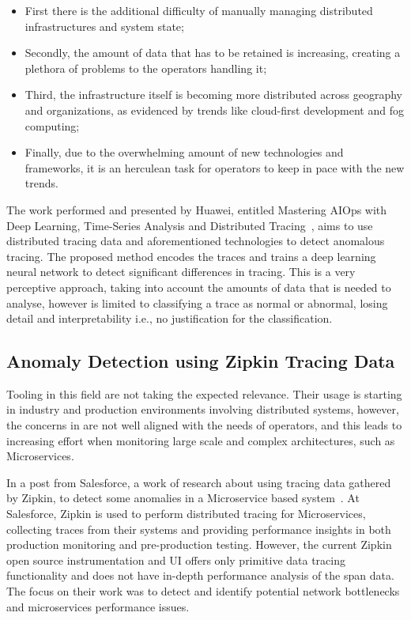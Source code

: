 \begin{itemize}
    \item First there is the additional difficulty of manually managing distributed infrastructures and system state;
    \item Secondly, the amount of data that has to be retained is increasing, creating a plethora of problems to the operators handling it;
    \item Third, the infrastructure itself is becoming more distributed across geography and organizations, as evidenced by trends like cloud-first development and fog computing;
    \item Finally, due to the overwhelming amount of new technologies and frameworks, it is an herculean task for operators to keep in pace with the new trends.
\end{itemize}

The work performed and presented by Huawei, entitled Mastering AIOps with Deep Learning, Time-Series Analysis and Distributed Tracing~\cite{mastering_aiops}, aims to use distributed tracing data and aforementioned technologies to detect anomalous tracing. The proposed method encodes the traces and trains a deep learning neural network to detect significant differences in tracing. This is a very perceptive approach, taking into account the amounts of data that is needed to analyse, however is limited to classifying a trace as normal or abnormal, losing detail and interpretability i.e., no justification for the classification.

\subsection{Anomaly Detection using Zipkin Tracing Data}
\label{subsec:anomaly_detection_using_zipkin_tracing_data}

Tooling in this field are not taking the expected relevance. Their usage is starting in industry and production environments involving distributed systems, however, the concerns in are not well aligned with the needs of operators, and this leads to increasing effort when monitoring large scale and complex architectures, such as Microservices.

In a post from Salesforce, a work of research about using tracing data gathered by Zipkin, to detect some anomalies in a Microservice based system~\cite{anomaly_detection_zipkin_tracing_data}. At Salesforce, Zipkin is used to perform distributed tracing for Microservices, collecting traces from their systems and providing performance insights in both production monitoring and pre-production testing. However, the current Zipkin open source instrumentation and UI offers only primitive data tracing functionality and does not have in-depth performance analysis of the span data. The focus on their work was to detect and identify potential network bottlenecks and microservices performance issues.

